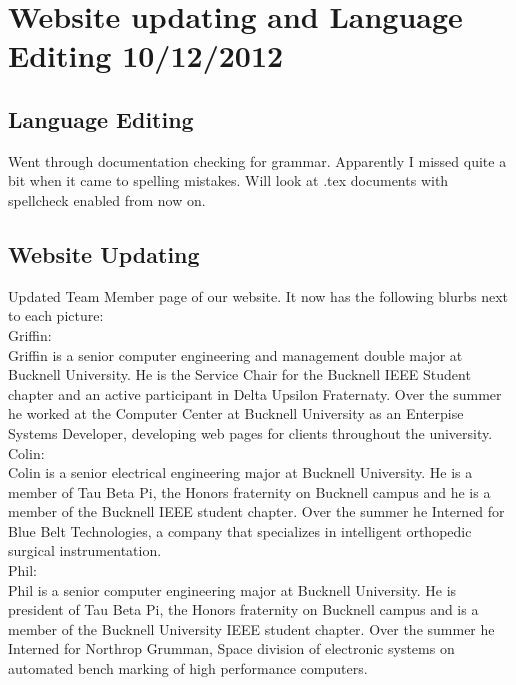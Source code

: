 \documentclass[]{article}
\begin{document}
	
	\section{Website updating and Language Editing 10/12/2012}

		\subsection{Language Editing}	
	Went through documentation checking for grammar. Apparently I missed quite a bit when it came to spelling mistakes. Will look at .tex documents with spellcheck enabled from now on. \\
	
		\subsection{Website Updating}
	Updated Team Member page of our website. It now has the following blurbs next to each picture: \\
	
	Griffin: \\
	Griffin is a senior computer engineering and management double major at Bucknell University. He is the Service Chair for the Bucknell IEEE Student chapter and an active participant in Delta Upsilon Fraternaty. Over the summer he worked at the Computer Center at Bucknell University as an Enterpise Systems Developer, developing web pages for clients throughout the university. \\
	
	Colin: \\
	Colin is a senior electrical engineering major at Bucknell University. He is a member of Tau Beta Pi, the Honors fraternity on Bucknell campus and he is a member of the Bucknell IEEE student chapter. Over the summer he Interned for Blue Belt Technologies, a company that specializes in intelligent orthopedic surgical instrumentation.\\
	
	Phil: \\
	Phil is a senior computer engineering major at Bucknell University. He is president of Tau Beta Pi, the Honors fraternity on Bucknell campus and is a member of the Bucknell University  IEEE student chapter. Over the summer he Interned for Northrop Grumman, Space division of electronic systems on automated bench marking of high performance computers. \\
	
\end{document}
